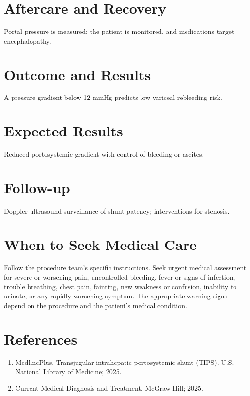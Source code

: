 \section*{Aftercare and Recovery}
Portal pressure is measured; the patient is monitored, and medications target encephalopathy.

\section*{Outcome and Results}
A pressure gradient below 12 mmHg predicts low variceal rebleeding risk.

\section*{Expected Results}
Reduced portosystemic gradient with control of bleeding or ascites.

\section*{Follow-up}
Doppler ultrasound surveillance of shunt patency; interventions for stenosis.

\section*{When to Seek Medical Care}
Follow the procedure team's specific instructions. Seek urgent medical assessment for severe or worsening pain, uncontrolled bleeding, fever or signs of infection, trouble breathing, chest pain, fainting, new weakness or confusion, inability to urinate, or any rapidly worsening symptom. The appropriate warning signs depend on the procedure and the patient's medical condition.

\section*{References}
\begin{enumerate}
  \item MedlinePlus. Transjugular intrahepatic portosystemic shunt (TIPS). U.S. National Library of Medicine; 2025.
  \item Current Medical Diagnosis and Treatment. McGraw-Hill; 2025.
\end{enumerate}

\clearpage
